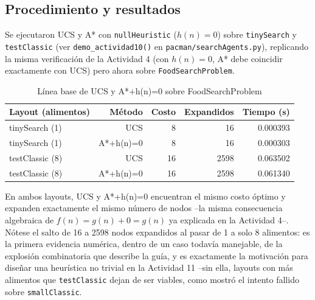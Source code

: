 \subsection{Procedimiento y resultados}

Se ejecutaron UCS y A* con \texttt{nullHeuristic} ($h(n)=0$) sobre \texttt{tinySearch} y
\texttt{testClassic} (ver \texttt{demo\_actividad10()} en \texttt{pacman/searchAgents.py}), replicando la
misma verificación de la Actividad 4 (con $h(n)=0$, A* debe coincidir exactamente con UCS) pero
ahora sobre \texttt{FoodSearchProblem}.

\begin{table}[H]
\centering
\caption{Línea base de UCS y A*+h(n)=0 sobre FoodSearchProblem}
\label{tab:act10-baseline}
\begin{tabular}{lrrrr}
\toprule
\textbf{Layout (alimentos)} & \textbf{Método} & \textbf{Costo} & \textbf{Expandidos} & \textbf{Tiempo (s)} \\
\midrule
tinySearch (1)   & UCS       & 8  & 16   & 0.000393 \\
tinySearch (1)   & A*+h(n)=0 & 8  & 16   & 0.000303 \\
testClassic (8)  & UCS       & 16 & 2598 & 0.063502 \\
testClassic (8)  & A*+h(n)=0 & 16 & 2598 & 0.061340 \\
\bottomrule
\end{tabular}
\end{table}

En ambos layouts, UCS y A*+h(n)=0 encuentran el mismo costo óptimo y expanden exactamente el mismo
número de nodos --la misma consecuencia algebraica de $f(n) = g(n) + 0 = g(n)$ ya explicada en la
Actividad 4--. Nótese el salto de 16 a 2598 nodos expandidos al pasar de 1 a solo 8 alimentos: es
la primera evidencia numérica, dentro de un caso todavía manejable, de la explosión combinatoria que
describe la guía, y es exactamente la motivación para diseñar una heurística no trivial en la
Actividad 11 --sin ella, layouts con más alimentos que \texttt{testClassic} dejan de ser viables,
como mostró el intento fallido sobre \texttt{smallClassic}.
